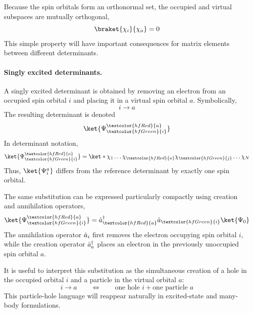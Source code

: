 \documentclass[11pt,a4paper,titlepage]{article}
\numberwithin{equation}{section}
\newcommand{\red}[1]{\textcolor{hfRed}{#1}}
\newcommand{\green}[1]{\textcolor{hfGreen}{#1}}
\newcommand{\cre}[1]{\Hat{a}_{#1}^\dag}
\newcommand{\ani}[1]{\Hat{a}_{#1}}
\begin{document}
Because the spin orbitals form an orthonormal set, the occupied and virtual
subspaces are mutually orthogonal,
\begin{equation}
  \braket{\chi_i}{\chi_a}=0
\end{equation}
This simple property will have important consequences for matrix elements
between different determinants.


\paragraph{Singly excited determinants.}

A singly excited determinant is obtained by removing an electron from
an occupied spin orbital $i$ and placing it in a virtual spin orbital $a$.
Symbolically,
\begin{equation}
  i\longrightarrow a
\end{equation}
The resulting determinant is denoted
\begin{equation}
  \ket{\Psi_{\green{i}}^{\red{a}}}
\end{equation}
In determinant notation,
\begin{equation}
  \ket{\Psi_{\green{i}}^{\red{a}}}
  =
  \ket*{
    \chi_1
    \ldots
    \chi_{\red{a}}
    \chi_{\green{j}}
    \ldots
    \chi_N
  }
\end{equation}
Thus, $\ket{\Psi_i^a}$ differs from the reference determinant by exactly one
spin orbital.

The same substitution can be expressed particularly compactly using
creation and annihilation operators,
\begin{equation}
  \ket{\Psi_{\green{i}}^{\red{a}}}
  =
  \cre{\red{a}}
  \ani{\green{i}}
  \ket{\Psi_0}
  \label{eq:single-excited-determinant}
\end{equation}
The annihilation operator $\ani{i}$ first removes the electron occupying
spin orbital $i$, while the creation operator $\cre{a}$ places an electron
in the previously unoccupied spin orbital $a$.

It is useful to interpret this substitution as the simultaneous creation of
a \green{hole} in the occupied orbital $i$ and a \red{particle} in the
virtual orbital $a$:
\begin{equation}
  i\rightarrow a
  \qquad\Longleftrightarrow\qquad
  \text{one hole }i
  +
  \text{one particle }a
\end{equation}
This particle-hole language will reappear naturally in excited-state and
many-body formulations.
\end{document}
